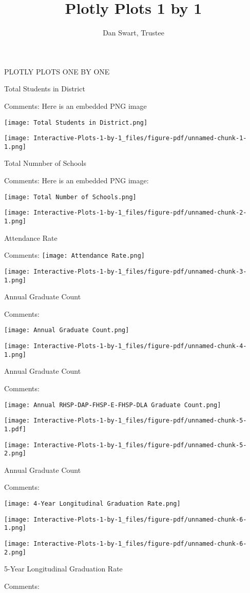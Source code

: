 \documentclass[
  letterpaper,
  DIV=11,
  numbers=noendperiod]{scrartcl}
\title{Plotly Plots 1 by 1}
\author{Dan Swart, Trustee}
\date{}
\begin{document}
\maketitle

PLOTLY PLOTS ONE BY ONE

Total Students in District

Comments: Here is an embedded PNG image

\texttt{[image: Total Students in District.png]}

\texttt{[image: Interactive-Plots-1-by-1\_files/figure-pdf/unnamed-chunk-1-1.png]}

Total Numnber of Schools

Comments: Here is an embedded PNG image:

\texttt{[image: Total Number of Schools.png]}

\texttt{[image: Interactive-Plots-1-by-1\_files/figure-pdf/unnamed-chunk-2-1.png]}

Attendance Rate

Comments: \texttt{[image: Attendance Rate.png]}

\texttt{[image: Interactive-Plots-1-by-1\_files/figure-pdf/unnamed-chunk-3-1.png]}

Annual Graduate Count

Comments:

\texttt{[image: Annual Graduate Count.png]}

\texttt{[image: Interactive-Plots-1-by-1\_files/figure-pdf/unnamed-chunk-4-1.png]}

Annual Graduate Count

Comments:

\texttt{[image: Annual RHSP-DAP-FHSP-E-FHSP-DLA Graduate Count.png]}

\texttt{[image: Interactive-Plots-1-by-1\_files/figure-pdf/unnamed-chunk-5-1.pdf]}

\texttt{[image: Interactive-Plots-1-by-1\_files/figure-pdf/unnamed-chunk-5-2.png]}

Annual Graduate Count

Comments:

\texttt{[image: 4-Year Longitudinal Graduation Rate.png]}

\texttt{[image: Interactive-Plots-1-by-1\_files/figure-pdf/unnamed-chunk-6-1.png]}

\texttt{[image: Interactive-Plots-1-by-1\_files/figure-pdf/unnamed-chunk-6-2.png]}

5-Year Longitudinal Graduation Rate

Comments:
\end{document}
